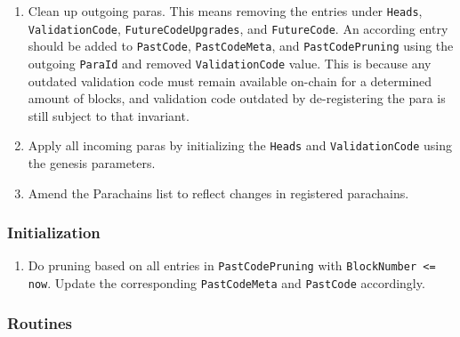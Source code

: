 \begin{enumerate}
    \item Clean up outgoing paras. This means removing the entries under
    \verb|Heads|, \verb|ValidationCode|, \verb|FutureCodeUpgrades|, and
    \verb|FutureCode|. An according entry should be added to \verb|PastCode|,
    \verb|PastCodeMeta|, and \verb|PastCodePruning| using the outgoing
    \verb|ParaId| and removed \verb|ValidationCode| value. This is because any
    outdated validation code must remain available on-chain for a determined
    amount of blocks, and validation code outdated by de-registering the para is
    still subject to that invariant.
    \item Apply all incoming paras by initializing the \verb|Heads| and
    \verb|ValidationCode| using the genesis parameters.
    \item Amend the Parachains list to reflect changes in registered parachains.
\end{enumerate}

\subsubsection{Initialization}

\begin{enumerate}
    \item Do pruning based on all entries in \verb|PastCodePruning| with
    \verb|BlockNumber <= now|. Update the corresponding \verb|PastCodeMeta| and
    \verb|PastCode| accordingly.
\end{enumerate}

\subsubsection{Routines}

